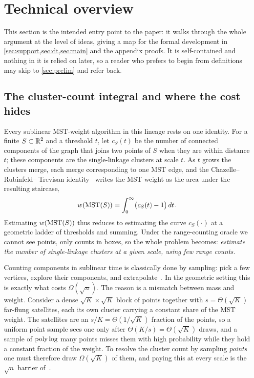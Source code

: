 \section{Technical overview}\label{sec:overview}

This section is the intended entry point to the paper: it walks through the whole argument at the level of
ideas, giving a map for the formal development in \cref{sec:support,sec:dt,sec:main} and the appendix
proofs. It is self-contained and nothing in it is relied on later, so a reader who prefers to begin from
definitions may skip to \cref{sec:prelim} and refer back.

\subsection{The cluster-count integral and where the cost hides}\label{sec:ov-integral}

Every sublinear MST-weight algorithm in this lineage rests on one identity. For a finite $S\subset\mathbb{R}^2$
and a threshold $t$, let $c_S(t)$ be the number of connected components of the graph that joins two points
of $S$ when they are within distance $t$; these components are the single-linkage clusters at scale $t$.
As $t$ grows the clusters merge, each merge corresponding to one MST edge, and the Chazelle--Rubinfeld--
Trevisan identity~\cite{CRT05} writes the MST weight as the area under the resulting staircase,
\begin{equation}\label{eq:ov-integral}
  w(\mathrm{MST}(S))=\int_0^\infty\bigl(c_S(t)-1\bigr)\,dt .
\end{equation}
Estimating $w(\mathrm{MST}(S))$ thus reduces to estimating the curve $c_S(\cdot)$ at a geometric ladder of
thresholds and summing. Under the range-counting oracle we cannot see points, only counts in boxes, so the
whole problem becomes: \emph{estimate the number of single-linkage clusters at a given scale, using few
range counts.}

Counting components in sublinear time is classically done by sampling: pick a few vertices, explore their
components, and extrapolate~\cite{CRT05,CzumajSohler09}. In the geometric setting this is exactly what
costs $\Omega(\sqrt n)$. The reason is a mismatch between mass and weight. Consider a dense
$\sqrt K\times\sqrt K$ block of points together with $s=\Theta(\sqrt K)$ far-flung satellites, each its
own cluster carrying a constant share of the MST weight. The satellites are an $s/K=\Theta(1/\sqrt K)$
fraction of the points, so a uniform point sample sees one only after $\Theta(K/s)=\Theta(\sqrt K)$ draws,
and a sample of $\operatorname{poly}\log$ many points misses them with high probability while they hold a constant
fraction of the weight. To resolve the cluster count by sampling \emph{points} one must therefore draw
$\Omega(\sqrt K)$ of them, and paying this at every scale is the $\sqrt n$ barrier of~\cite{DMOSW25}.

